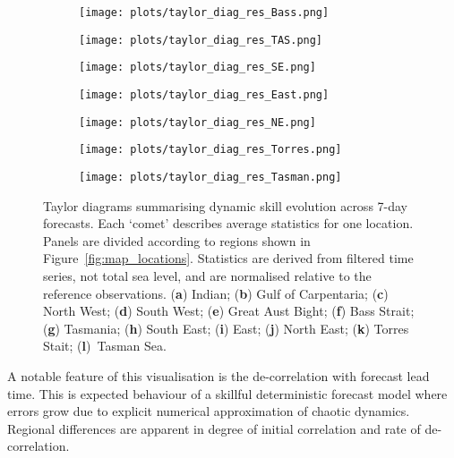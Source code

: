 \documentclass[jmse,article,accept,moreauthors,pdftex,10pt,a4paper]{mdpi}
\begin{document}
\begin{figure}[H]
\begin{subfigure}{0.30\textwidth}
        \texttt{[image: plots/taylor\_diag\_res\_Bass.png]}
        \caption{}
    \end{subfigure}
    \begin{subfigure}{0.30\textwidth}
          \texttt{[image: plots/taylor\_diag\_res\_TAS.png]}
        \caption{}
    \end{subfigure}
    \begin{subfigure}{0.30\textwidth}
        \texttt{[image: plots/taylor\_diag\_res\_SE.png]}
        \caption{}
    \end{subfigure}
    \begin{subfigure}{0.30\textwidth}
        \texttt{[image: plots/taylor\_diag\_res\_East.png]}
        \caption{}
    \end{subfigure}
    \begin{subfigure}{0.30\textwidth}
        \texttt{[image: plots/taylor\_diag\_res\_NE.png]}
        \caption{}
    \end{subfigure}
    \begin{subfigure}{0.30\textwidth}
        \texttt{[image: plots/taylor\_diag\_res\_Torres.png]}
        \caption{}
    \end{subfigure}
    \begin{subfigure}{0.30\textwidth}
        \texttt{[image: plots/taylor\_diag\_res\_Tasman.png]}
        \caption{}
    \end{subfigure}
    \caption{ Taylor diagrams summarising dynamic skill evolution across 7-day forecasts.
    Each `comet' describes average statistics for one location.
    Panels are divided according to regions shown in Figure~\ref{fig:map_locations}.
    Statistics are derived from filtered time series, not total sea level, and are normalised relative to the reference observations. (\textbf{a}) Indian; (\textbf{b}) Gulf of Carpentaria; (\textbf{c}) North West; (\textbf{d}) South West; (\textbf{e}) Great Aust Bight; (\textbf{f}) Bass Strait; (\textbf{g}) Tasmania; (\textbf{h}) South East; (\textbf{i}) East; (\textbf{j}) North East; (\textbf{k}) Torres Stait; (\textbf{l})~Tasman Sea. }\vspace{-12pt}
    \label{fig:taylors}
\end{figure}   
A notable feature of this visualisation is the de-correlation with forecast lead time.   
This is expected behaviour of a skillful deterministic forecast model where errors grow due to explicit numerical approximation of chaotic dynamics. 
Regional differences are apparent in degree of initial correlation and rate of de-correlation.
\end{document}
